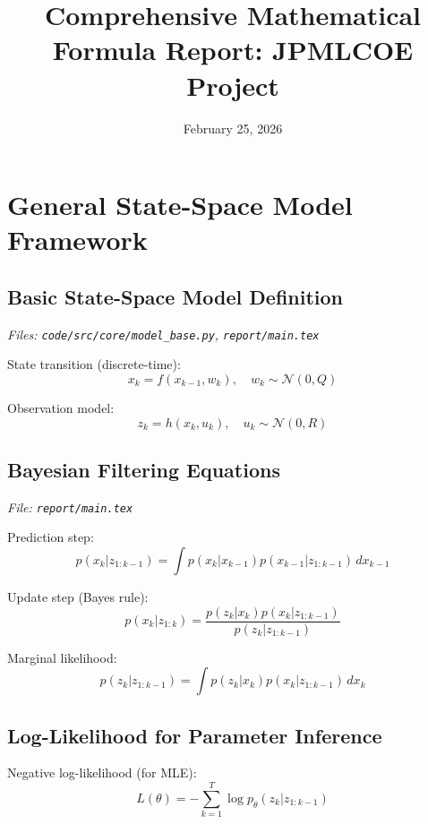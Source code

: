 \documentclass[12pt]{article}
\title{Comprehensive Mathematical Formula Report: JPMLCOE Project}
\author{}
\date{February 25, 2026}
\begin{document}
\maketitle
\tableofcontents
\newpage

\section{General State-Space Model Framework}

\subsection{Basic State-Space Model Definition}
\textit{Files: \texttt{code/src/core/model\_base.py}, \texttt{report/main.tex}}

State transition (discrete-time):
\begin{equation}
x_k = f(x_{k-1}, w_k), \quad w_k \sim \mathcal{N}(0, Q)
\end{equation}

Observation model:
\begin{equation}
z_k = h(x_k, u_k), \quad u_k \sim \mathcal{N}(0, R)
\end{equation}

\subsection{Bayesian Filtering Equations}
\textit{File: \texttt{report/main.tex}}

Prediction step:
\begin{equation}
p(x_k | z_{1:k-1}) = \int p(x_k | x_{k-1}) p(x_{k-1} | z_{1:k-1}) \, dx_{k-1}
\end{equation}

Update step (Bayes rule):
\begin{equation}
p(x_k | z_{1:k}) = \frac{p(z_k | x_k) p(x_k | z_{1:k-1})}{p(z_k | z_{1:k-1})}
\end{equation}

Marginal likelihood:
\begin{equation}
p(z_k | z_{1:k-1}) = \int p(z_k | x_k) p(x_k | z_{1:k-1}) \, dx_k
\end{equation}

\subsection{Log-Likelihood for Parameter Inference}

Negative log-likelihood (for MLE):
\begin{equation}
L(\theta) = -\sum_{k=1}^{T} \log p_\theta(z_k | z_{1:k-1})
\end{equation}
\end{document}
